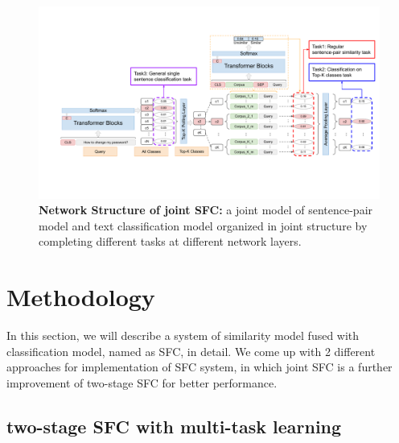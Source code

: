 \documentclass[letterpaper]{article} %
\begin{document}
  \begin{figure}[t]
    \begin{centering}
      \includegraphics[scale=0.72]{picture/picture4} 
      \par
    \end{centering}
    \caption{
      \textbf{Network   Structure   of  joint  SFC:}  a  joint  model  of
      sentence-pair   model   and   text   classification   model  organized  in
      joint  structure by completing different tasks at different network
      layers.
    }
    \label{fig:framework}
  \end{figure}

  \section{Methodology}
  In  this  section,  we  will  describe a system of similarity model fused with
  classification  model,  named  as  SFC, in detail. We come up with 2 different
  approaches  for  implementation  of SFC system, in which joint SFC is a
  further improvement of two-stage SFC for better performance.

  \subsection{two-stage SFC with multi-task learning}
\end{document}
